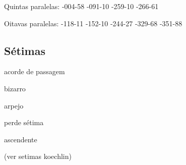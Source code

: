 \documentclass{article}
\begin{document}
Quintas paralelas:
-004-58 
-091-10 
-259-10 
-266-61 
 
Oitavas paralelas:
-118-11 
-152-10 
-244-27 
-329-68 
-351-88 

\subsection{Sétimas}
\label{sec:setimas}

acorde de passagem

bizarro

arpejo

perde sétima

ascendente

(ver setimas koechlin)

\renewcommand{\refname}{Referências Bibliográficas}


\end{document}
